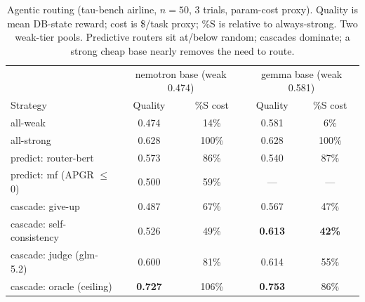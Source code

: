 \documentclass[11pt]{article}
\newcommand{\TAUN}{50}
\begin{document}
\begin{table}[h]
\centering
\caption{Agentic routing (tau-bench airline, $n{=}\TAUN{}$, 3 trials, param-cost proxy). Quality is
mean DB-state reward; cost is \$/task proxy; \%S is relative to always-strong. Two weak-tier pools.
Predictive routers sit at/below random; cascades dominate; a strong cheap base nearly removes the
need to route.}
\label{tab:agentic}
\scriptsize
\begin{tabular}{@{}lcccc@{}}
\toprule
 & \multicolumn{2}{c}{nemotron base (weak 0.474)} & \multicolumn{2}{c}{gemma base (weak 0.581)} \\
Strategy & Quality & \%S cost & Quality & \%S cost \\
\midrule
all-weak              & 0.474 & 14\% & 0.581 & 6\% \\
all-strong            & 0.628 & 100\% & 0.628 & 100\% \\
predict: router-bert  & 0.573 & 86\% & 0.540 & 87\% \\
predict: mf (APGR $\le$0) & 0.500 & 59\% & --- & --- \\
cascade: give-up      & 0.487 & 67\% & 0.567 & 47\% \\
cascade: self-consistency & 0.526 & 49\% & \textbf{0.613} & \textbf{42\%} \\
cascade: judge (glm-5.2) & 0.600 & 81\% & 0.614 & 55\% \\
cascade: oracle (ceiling) & \textbf{0.727} & 106\% & \textbf{0.753} & 86\% \\
\bottomrule
\end{tabular}
\end{table}
\end{document}
